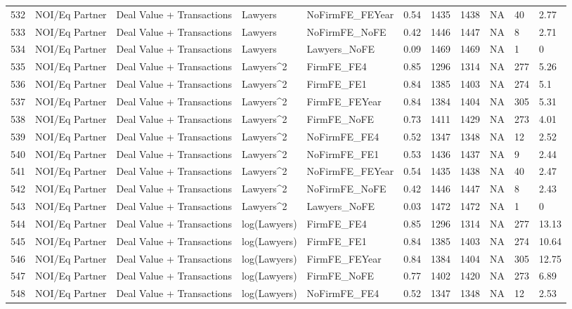 \documentclass{article}
\begin{document}
\begin{table}[H]
\begin{tabular}{rllllllllll}
  532 & NOI/Eq Partner & Deal Value + Transactions & Lawyers & NoFirmFE\_FEYear & 0.54 & 1435 & 1438 & NA & 40 & 2.77 \\ 
  533 & NOI/Eq Partner & Deal Value + Transactions & Lawyers & NoFirmFE\_NoFE & 0.42 & 1446 & 1447 & NA & 8 & 2.71 \\ 
  534 & NOI/Eq Partner & Deal Value + Transactions & Lawyers & Lawyers\_NoFE & 0.09 & 1469 & 1469 & NA & 1 & 0 \\ 
  535 & NOI/Eq Partner & Deal Value + Transactions & Lawyers^2 & FirmFE\_FE4 & 0.85 & 1296 & 1314 & NA & 277 & 5.26 \\ 
  536 & NOI/Eq Partner & Deal Value + Transactions & Lawyers^2 & FirmFE\_FE1 & 0.84 & 1385 & 1403 & NA & 274 & 5.1 \\ 
  537 & NOI/Eq Partner & Deal Value + Transactions & Lawyers^2 & FirmFE\_FEYear & 0.84 & 1384 & 1404 & NA & 305 & 5.31 \\ 
  538 & NOI/Eq Partner & Deal Value + Transactions & Lawyers^2 & FirmFE\_NoFE & 0.73 & 1411 & 1429 & NA & 273 & 4.01 \\ 
  539 & NOI/Eq Partner & Deal Value + Transactions & Lawyers^2 & NoFirmFE\_FE4 & 0.52 & 1347 & 1348 & NA & 12 & 2.52 \\ 
  540 & NOI/Eq Partner & Deal Value + Transactions & Lawyers^2 & NoFirmFE\_FE1 & 0.53 & 1436 & 1437 & NA & 9 & 2.44 \\ 
  541 & NOI/Eq Partner & Deal Value + Transactions & Lawyers^2 & NoFirmFE\_FEYear & 0.54 & 1435 & 1438 & NA & 40 & 2.47 \\ 
  542 & NOI/Eq Partner & Deal Value + Transactions & Lawyers^2 & NoFirmFE\_NoFE & 0.42 & 1446 & 1447 & NA & 8 & 2.43 \\ 
  543 & NOI/Eq Partner & Deal Value + Transactions & Lawyers^2 & Lawyers\_NoFE & 0.03 & 1472 & 1472 & NA & 1 & 0 \\ 
  544 & NOI/Eq Partner & Deal Value + Transactions & log(Lawyers) & FirmFE\_FE4 & 0.85 & 1296 & 1314 & NA & 277 & 13.13 \\ 
  545 & NOI/Eq Partner & Deal Value + Transactions & log(Lawyers) & FirmFE\_FE1 & 0.84 & 1385 & 1403 & NA & 274 & 10.64 \\ 
  546 & NOI/Eq Partner & Deal Value + Transactions & log(Lawyers) & FirmFE\_FEYear & 0.84 & 1384 & 1404 & NA & 305 & 12.75 \\ 
  547 & NOI/Eq Partner & Deal Value + Transactions & log(Lawyers) & FirmFE\_NoFE & 0.77 & 1402 & 1420 & NA & 273 & 6.89 \\ 
  548 & NOI/Eq Partner & Deal Value + Transactions & log(Lawyers) & NoFirmFE\_FE4 & 0.52 & 1347 & 1348 & NA & 12 & 2.53 \\ 

\end{tabular}
\end{table}
\end{document}
